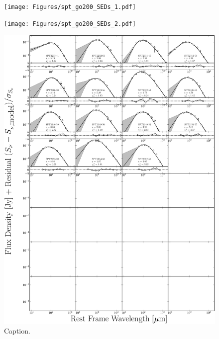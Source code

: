 \begin{figure}
	\centering
	\texttt{[image: Figures/spt\_go200\_SEDs\_1.pdf]}
\end{figure}
\begin{figure}
	\centering
	\texttt{[image: Figures/spt\_go200\_SEDs\_2.pdf]}
\end{figure}
\begin{figure}
	\centering
	\includegraphics[width=\columnwidth]{Figures/spt_go200_SEDs_3.pdf}
	\caption[Caption]{Caption.}
\end{figure}
